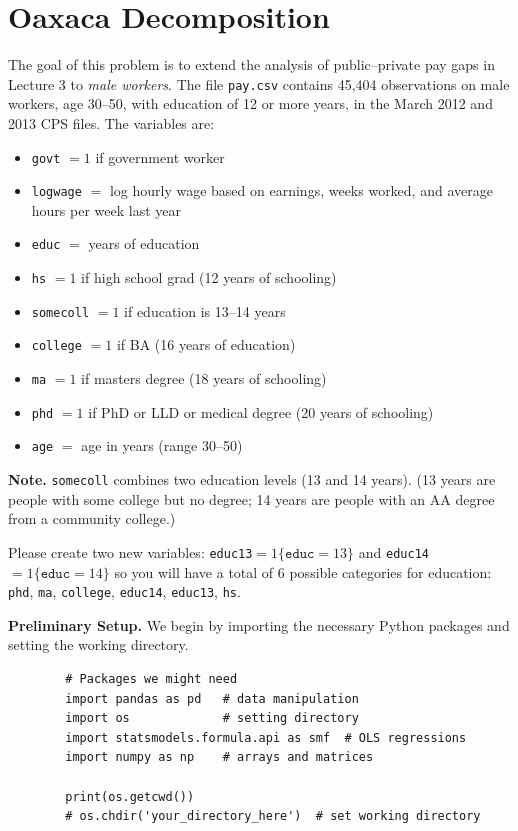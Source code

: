 \documentclass[12pt]{article}
\numberwithin{equation}{section}
\begin{document}
\bigskip

\section{Oaxaca Decomposition}  %

The goal of this problem is to extend the analysis of public--private pay gaps in Lecture 3 to \emph{male workers}. The file \texttt{pay.csv} contains 45{,}404 observations on male workers, age 30--50, with education of 12 or more years, in the March 2012 and 2013 CPS files. The variables are:
\begin{itemize}[leftmargin=2em]
  \item \texttt{govt} $=1$ if government worker
  \item \texttt{logwage} $=$ log hourly wage based on earnings, weeks worked, and average hours per week last year
  \item \texttt{educ} $=$ years of education
  \item \texttt{hs} $=1$ if high school grad (12 years of schooling)
  \item \texttt{somecoll} $=1$ if education is 13--14 years
  \item \texttt{college} $=1$ if BA (16 years of education)
  \item \texttt{ma} $=1$ if masters degree (18 years of schooling)
  \item \texttt{phd} $=1$ if PhD or LLD or medical degree (20 years of schooling)
  \item \texttt{age} $=$ age in years (range 30--50)
\end{itemize}

\noindent\textbf{Note.} \texttt{somecoll} combines two education levels (13 and 14 years). (13 years are people with some college but no degree; 14 years are people with an AA degree from a community college.)

\medskip
\noindent Please create two new variables: \texttt{educ13}$=1\{\texttt{educ}=13\}$ and \texttt{educ14}$=1\{\texttt{educ}=14\}$ so you will have a total of 6 possible categories for education: \texttt{phd}, \texttt{ma}, \texttt{college}, \texttt{educ14}, \texttt{educ13}, \texttt{hs}.

    \bigskip
    \textbf{Preliminary Setup.}  
    We begin by importing the necessary Python packages and setting the working directory.
    
        \begin{listing}[H]
        \begin{verbatim}
        # Packages we might need
        import pandas as pd   # data manipulation
        import os             # setting directory
        import statsmodels.formula.api as smf  # OLS regressions
        import numpy as np    # arrays and matrices
        
        print(os.getcwd())
        # os.chdir('your_directory_here')  # set working directory
        \end{verbatim}
        \caption{Python setup: packages and working directory.}
        \end{listing}
\end{document}

